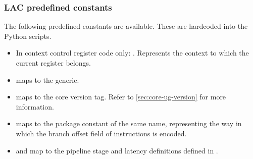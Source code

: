 
\subsubsection{LAC predefined constants}
\label{sec:core-ug-cfg-cregs-predef}

The following predefined constants are available. These are hardcoded into the
Python scripts.

\begin{itemize}

\item In context control register code only: . Represents the
context to which the current register belongs.

\item {} maps to the  generic.

\item {} maps to the core version tag. Refer to
\ref{sec:core-ug-version} for more information.

\item {} maps to the package constant of the same
name, representing the way in which the branch offset field of instructions is
encoded.

\item {} and  map to the pipeline stage and
latency definitions defined in .

\end{itemize}


